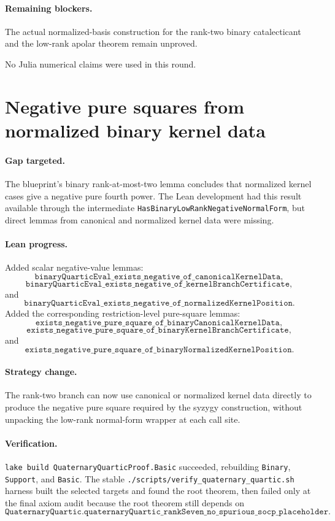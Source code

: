 \documentclass[11pt]{article}
\begin{document}
\paragraph{Remaining blockers.}
The actual normalized-basis construction for the rank-two binary catalecticant
and the low-rank apolar theorem remain unproved.

No Julia numerical claims were used in this round.

\section*{Negative pure squares from normalized binary kernel data}

\paragraph{Gap targeted.}
The blueprint's binary rank-at-most-two lemma concludes that normalized kernel
cases give a negative pure fourth power.  The Lean development had this result
available through the intermediate
\texttt{HasBinaryLowRankNegativeNormalForm}, but direct lemmas from canonical
and normalized kernel data were missing.

\paragraph{Lean progress.}
Added scalar negative-value lemmas:
\[
\texttt{binaryQuarticEval\_exists\_negative\_of\_canonicalKernelData},
\]
\[
\texttt{binaryQuarticEval\_exists\_negative\_of\_kernelBranchCertificate},
\]
and
\[
\texttt{binaryQuarticEval\_exists\_negative\_of\_normalizedKernelPosition}.
\]
Added the corresponding restriction-level pure-square lemmas:
\[
\texttt{exists\_negative\_pure\_square\_of\_binaryCanonicalKernelData},
\]
\[
\texttt{exists\_negative\_pure\_square\_of\_binaryKernelBranchCertificate},
\]
and
\[
\texttt{exists\_negative\_pure\_square\_of\_binaryNormalizedKernelPosition}.
\]

\paragraph{Strategy change.}
The rank-two branch can now use canonical or normalized kernel data directly to
produce the negative pure square required by the syzygy construction, without
unpacking the low-rank normal-form wrapper at each call site.

\paragraph{Verification.}
\texttt{lake build QuaternaryQuarticProof.Basic} succeeded, rebuilding
\texttt{Binary}, \texttt{Support}, and \texttt{Basic}.  The stable
\texttt{./scripts/verify\_quaternary\_quartic.sh} harness built the selected
targets and found the root theorem, then failed only at the final axiom audit
because the root theorem still depends on
\[
\texttt{QuaternaryQuartic.quaternaryQuartic\_rankSeven\_no\_spurious\_socp\_placeholder}.
\]
\end{document}
